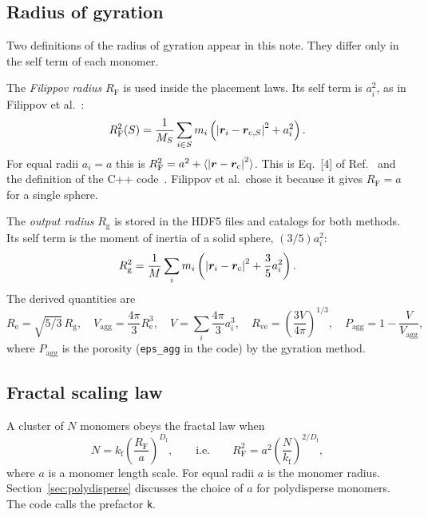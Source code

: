 \documentclass[11pt,a4paper]{article}
\newcommand{\Df}{D_\text{f}}
\newcommand{\kf}{k_\text{f}}
\newcommand{\RF}{R_\text{F}}
\newcommand{\Rg}{R_\text{g}}
\begin{document}
\subsection{Radius of gyration}
\label{sec:rg}

Two definitions of the radius of gyration appear in this note.
They differ only in the self term of each monomer.

The \emph{Filippov radius} $\RF$ is used inside the placement laws.
Its self term is $a_i^2$, as in Filippov et al.~\cite{filippov2000}:
\begin{equation}
  \RF^2(S) = \frac{1}{M_S} \sum_{i \in S} m_i \left( \abs{\bm{r}_i - \bm{r}_{\text{c},S}}^2 + a_i^2 \right).
  \label{eq:rg-filippov}
\end{equation}
For equal radii $a_i = a$ this is $\RF^2 = a^2 + \langle \abs{\bm{r} - \bm{r}_\text{c}}^2 \rangle$.
This is Eq.~[4] of Ref.~\cite{filippov2000} and the definition of the C++ code~\cite{moteki2019}.
Filippov et al.\ chose it because it gives $\RF = a$ for a single sphere.

The \emph{output radius} $\Rg$ is stored in the HDF5 files and catalogs for both methods.
Its self term is the moment of inertia of a solid sphere, $(3/5)a_i^2$:
\begin{equation}
  \Rg^2 = \frac{1}{M} \sum_{i} m_i \left( \abs{\bm{r}_i - \bm{r}_\text{c}}^2 + \frac{3}{5} a_i^2 \right).
  \label{eq:rg-output}
\end{equation}
The derived quantities are
\begin{equation}
  R_\text{e} = \sqrt{5/3}\,\Rg, \quad
  V_\text{agg} = \frac{4\pi}{3} R_\text{e}^3, \quad
  V = \sum_i \frac{4\pi}{3} a_i^3, \quad
  R_\text{ve} = \left( \frac{3V}{4\pi} \right)^{1/3}, \quad
  P_\text{agg} = 1 - \frac{V}{V_\text{agg}} ,
  \label{eq:derived}
\end{equation}
where $P_\text{agg}$ is the porosity (\texttt{eps\_agg} in the code) by the gyration method.

\subsection{Fractal scaling law}
\label{sec:fractal-law}

A cluster of $N$ monomers obeys the fractal law when
\begin{equation}
  N = \kf \left( \frac{\RF}{a} \right)^{\Df} ,
  \qquad\text{i.e.}\qquad
  \RF^2 = a^2 \left( \frac{N}{\kf} \right)^{2/\Df} ,
  \label{eq:fractal-law}
\end{equation}
where $a$ is a monomer length scale.
For equal radii $a$ is the monomer radius.
Section~\ref{sec:polydisperse} discusses the choice of $a$ for polydisperse monomers.
The code calls the prefactor \texttt{k}.
\end{document}
